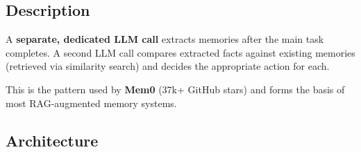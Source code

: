 \documentclass[11pt, letterpaper]{article}
\begin{document}
\subsection{Description}

A \textbf{separate, dedicated LLM call} extracts memories after the main task completes.
A second LLM call compares extracted facts against existing memories (retrieved via
similarity search) and decides the appropriate action for each.

This is the pattern used by \textbf{Mem0} (37k+ GitHub stars) and forms the basis
of most RAG-augmented memory systems.

\subsection{Architecture}
\end{document}
